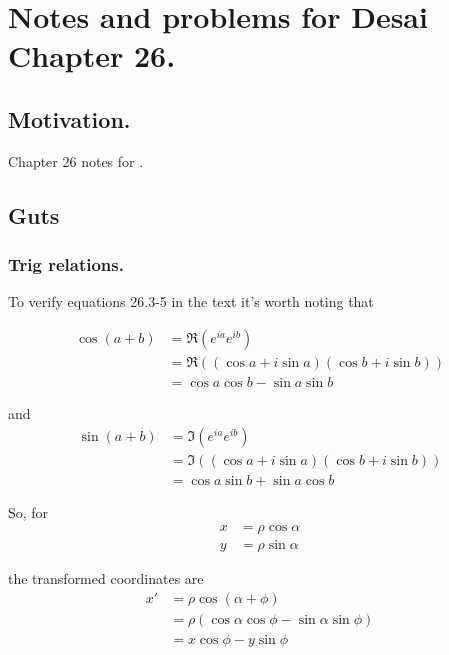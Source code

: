 
%

\chapter{Notes and problems for Desai Chapter 26.}
\label{chap:desaiCh26}
{}
\date{Dec 9, 2010}

\beginArtWithToc

\section{Motivation.}

Chapter 26 notes for \cite{desai2009quantum}.

\section{Guts}

\subsection{Trig relations.}

To verify equations 26.3-5 in the text it's worth noting that 

\begin{align*}
\cos(a + b) 
&= \Re( e^{ia} e^{ib} ) \\
&= \Re( (\cos a + i \sin a)( \cos b + i \sin b) ) \\
&= \cos a \cos b - \sin a \sin b
\end{align*}

and
\begin{align*}
\sin(a + b) 
&= \Im( e^{ia} e^{ib} ) \\
&= \Im( (\cos a + i \sin a)( \cos b + i \sin b) ) \\
&= \cos a \sin b + \sin a \cos b
\end{align*}

So, for 
\begin{align}\label{eqn:desaiCh26:10}
x &= \rho \cos\alpha \\
y &= \rho \sin\alpha 
\end{align}

the transformed coordinates are
\begin{align*}
x' 
&= \rho \cos(\alpha + \phi) \\
&= \rho (\cos \alpha \cos \phi - \sin \alpha \sin \phi) \\
&= x \cos \phi - y \sin \phi
\end{align*}

